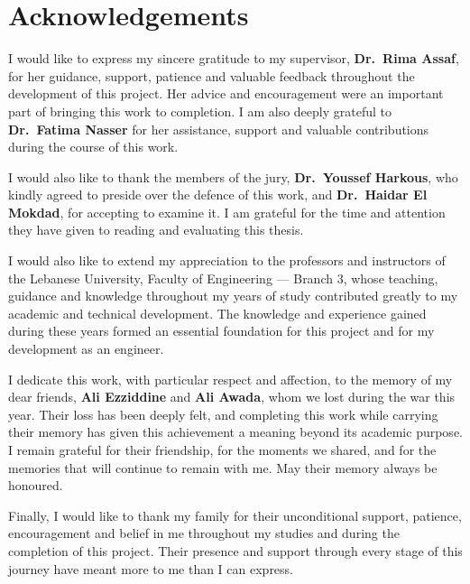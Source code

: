 \chapter*{Acknowledgements}

I would like to express my sincere gratitude to my supervisor, \textbf{Dr.~Rima Assaf}, for her
guidance, support, patience and valuable feedback throughout the development of this project. Her
advice and encouragement were an important part of bringing this work to completion. I am also
deeply grateful to \textbf{Dr.~Fatima Nasser} for her assistance, support and valuable
contributions during the course of this work.

I would also like to thank the members of the jury, \textbf{Dr.~Youssef Harkous}, who kindly agreed
to preside over the defence of this work, and \textbf{Dr.~Haidar El Mokdad}, for accepting to
examine it. I am grateful for the time and attention they have given to reading and evaluating this
thesis.

I would also like to extend my appreciation to the professors and instructors of the Lebanese
University, Faculty of Engineering --- Branch 3, whose teaching, guidance and knowledge throughout
my years of study contributed greatly to my academic and technical development. The knowledge and
experience gained during these years formed an essential foundation for this project and for my
development as an engineer.

I dedicate this work, with particular respect and affection, to the memory of my dear friends,
\textbf{Ali Ezziddine} and \textbf{Ali Awada}, whom we lost during the war this year. Their loss has
been deeply felt, and completing this work while carrying their memory has given this achievement a
meaning beyond its academic purpose. I remain grateful for their friendship, for the moments we
shared, and for the memories that will continue to remain with me. May their memory always be
honoured.

Finally, I would like to thank my family for their unconditional support, patience, encouragement
and belief in me throughout my studies and during the completion of this project. Their presence and
support through every stage of this journey have meant more to me than I can express.
